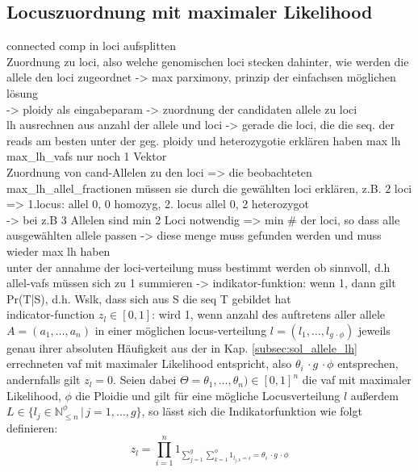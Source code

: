 \subsection{Locuszuordnung mit maximaler Likelihood} \label{subsec:sol_loci_lh}
connected comp in loci aufsplitten\\
Zuordnung zu loci, also welche genomischen loci stecken dahinter, wie werden die allele den loci zugeordnet -> max parximony, prinzip der einfachsen möglichen lösung \\
-> ploidy als eingabeparam -> zuordnung der candidaten allele zu loci\\
lh ausrechnen aus anzahl der allele und loci -> gerade die loci, die die seq. der reads am besten unter der geg. ploidy und heterozygotie erklären haben max lh
max\_lh\_vafs nur noch 1 Vektor\\
Zuordnung von cand-Allelen zu den loci => die beobachteten max\_lh\_allel\_fractionen müssen sie durch die gewählten loci erklären, z.B. 2 loci => 1.locus: allel 0, 0 homozyg, 2. locus allel 0, 2 heterozygot\\
-> bei z.B 3 Allelen sind min 2 Loci notwendig => min \# der loci, so dass alle ausgewählten allele passen -> diese menge muss gefunden werden und muss wieder max lh haben\\
unter der annahme der loci-verteilung muss bestimmt werden ob sinnvoll, d.h allel-vafs müssen sich zu 1 summieren -> indikator-funktion: wenn 1, dann gilt Pr(T|S), d.h. Wslk, dass sich aus S die seq T gebildet hat\\

indicator-function $z_{l} \in {[0,1]}$: wird 1, wenn anzahl des auftretens aller allele $A = (a_{1}, \dots, a_{n})$ in einer möglichen locus-verteilung $l = (l_{1}, \dots, l_{g \, \cdotp \phi})$ jeweils genau ihrer absoluten Häufigkeit aus der in Kap. \ref{subsec:sol_allele_lh} errechneten vaf mit maximaler Likelihood entspricht, also $\theta_{i} \, \cdotp g \, \cdotp \phi$ entsprechen, andernfalls gilt $ z_{l} = 0 $. Seien dabei  $\Theta=\theta_{1},\dots,\theta_{n}) \in [0,1]^n $ die vaf mit maximaler Likelihood, $ \phi $ die Ploidie und gilt für eine mögliche Locusverteilung $l$ außerdem $L \in \{l_{j} \in \mathds{N}_{\leq n}^\phi \, | \, j=1, \dots, g\}$, so lässt sich die Indikatorfunktion wie folgt definieren:
\begin{equation} \label{eqn:2-xxx4}
\tag{2-xxx4}
z_{l}=\prod_{i=1}^{n}1_{\sum_{j=1}^{g}\sum_{k=1}^{\phi}1_{l_{j,k}=i} = \theta_{i} \, \cdotp g \, \cdotp \phi}
\end{equation}


